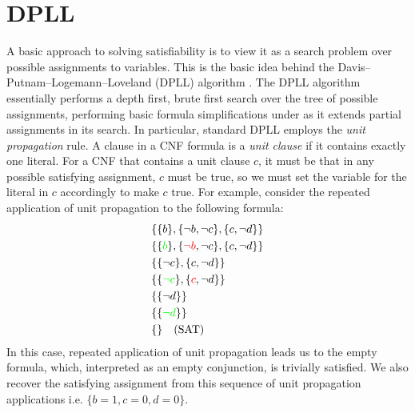 \documentclass[12pt]{article}
\begin{document}
\section{DPLL}

A basic approach to solving satisfiability is to view it as a search problem over possible assignments to variables. This is the basic idea behind the Davis–Putnam–Logemann–Loveland (DPLL) algorithm \cite{dpll1961}. The DPLL algorithm essentially performs a depth first, brute first search over the tree of possible assignments, performing basic formula simplifications under as it extends partial assignments in its search. In particular, standard DPLL employs the \textit{unit propagation} rule. A clause in a CNF formula is a \textit{unit clause} if it contains exactly one literal. For a CNF that contains a unit clause $c$, it must be that in any possible satisfying assignment, $c$ must be true, so we must set the variable for the literal in $c$ accordingly to make $c$ true. For example, consider the repeated application of unit propagation to the following formula:
\begin{align*}
    &\{\{b\}, \{\neg b, \neg c\}, \{c, \neg d\}\}\\
    &\{\{\textcolor{green}{b}\}, \{\textcolor{red}{\neg b}, \neg c\}, \{c, \neg d\}\}\\
    &\{\{\neg c\}, \{c, \neg d\}\} \\
    &\{\{\textcolor{green}{\neg c}\}, \{\textcolor{red}{c}, \neg d\}\}\\
    &\{\{\neg d\}\}\\
    &\{\{\textcolor{green}{\neg d}\}\}\\
    &\{\} \quad (\text{SAT})
\end{align*}
In this case, repeated application of unit propagation leads us to the empty formula, which, interpreted as an empty conjunction, is trivially satisfied. We also recover the satisfying assignment from this sequence of unit propagation applications i.e. $\{b=1,c=0,d=0\}$.
\end{document}
